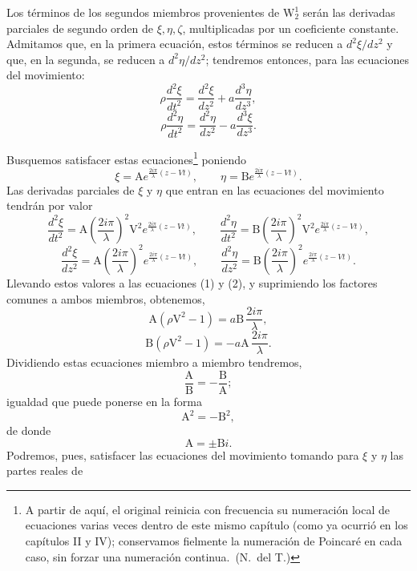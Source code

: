 Los términos de los segundos miembros provenientes de $\mathrm{W}_2^1$ serán las
derivadas parciales de segundo orden de $\xi,\eta,\zeta$, multiplicadas por
un coeficiente constante. Admitamos que, en la primera ecuación, estos
términos se reducen a $d^2\xi/dz^2$ y que, en la segunda, se reducen a
$d^2\eta/dz^2$; tendremos entonces, para las ecuaciones del movimiento:
\begin{equation}
\rho\frac{d^2\xi}{dt^2}=\frac{d^2\xi}{dz^2}+a\frac{d^3\eta}{dz^3},
\tag{1}
\end{equation}
\begin{equation}
\rho\frac{d^2\eta}{dt^2}=\frac{d^2\eta}{dz^2}-a\frac{d^3\xi}{dz^3}.
\tag{2}
\end{equation}

Busquemos satisfacer estas ecuaciones\footnote{A
partir de aquí, el original reinicia con frecuencia su numeración local de
ecuaciones varias veces dentro de este mismo capítulo (como ya ocurrió en
los capítulos II y IV); conservamos fielmente la numeración de Poincaré en
cada caso, sin forzar una numeración continua.~(N.~del T.)} poniendo
\[
\xi=\mathrm Ae^{\frac{2i\pi}{\lambda}(z-Vt)},\qquad
\eta=\mathrm Be^{\frac{2i\pi}{\lambda}(z-Vt)}.
\]
Las derivadas parciales de $\xi$ y $\eta$ que entran en las ecuaciones del
movimiento tendrán por valor
\[
\frac{d^2\xi}{dt^2}=\mathrm A\left(\frac{2i\pi}{\lambda}\right)^2\mathrm V^2
e^{\frac{2i\pi}{\lambda}(z-Vt)},\qquad
\frac{d^2\eta}{dt^2}=\mathrm B\left(\frac{2i\pi}{\lambda}\right)^2\mathrm V^2
e^{\frac{2i\pi}{\lambda}(z-Vt)},
\]
\[
\frac{d^2\xi}{dz^2}=\mathrm A\left(\frac{2i\pi}{\lambda}\right)^2
e^{\frac{2i\pi}{\lambda}(z-Vt)},\qquad
\frac{d^2\eta}{dz^2}=\mathrm B\left(\frac{2i\pi}{\lambda}\right)^2
e^{\frac{2i\pi}{\lambda}(z-Vt)}.
\]
Llevando estos valores a las ecuaciones (1) y (2), y suprimiendo los
factores comunes a ambos miembros, obtenemos,
\begin{equation}
\mathrm A(\rho\mathrm V^2-1)=a\mathrm B\,\frac{2i\pi}{\lambda},
\tag{3}
\end{equation}
\begin{equation}
\mathrm B(\rho\mathrm V^2-1)=-a\mathrm A\,\frac{2i\pi}{\lambda}.
\tag{4}
\end{equation}
Dividiendo estas ecuaciones miembro a miembro tendremos,
\[
\frac{\mathrm A}{\mathrm B}=-\frac{\mathrm B}{\mathrm A};
\]
igualdad que puede ponerse en la forma
\[
\mathrm A^2=-\mathrm B^2,
\]
de donde
\[
\mathrm A=\pm \mathrm Bi.
\]
Podremos, pues, satisfacer las ecuaciones del movimiento tomando para
$\xi$ y $\eta$ las partes reales de
